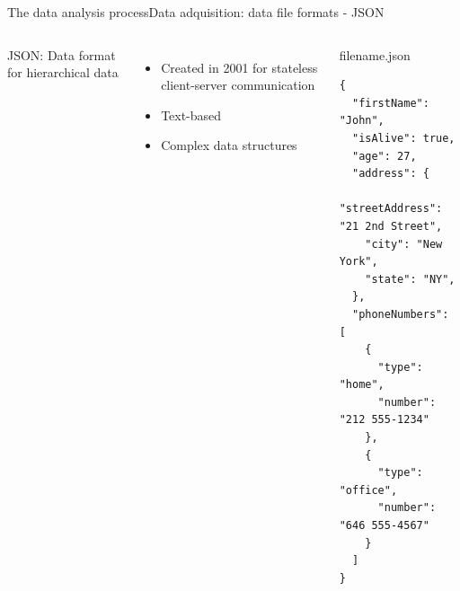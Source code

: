 \documentclass[10pt,compress]{beamer} %
\begin{document}
\begin{frame}[fragile]{The data analysis process}{Data adquisition: data file formats - JSON}
	\begin{columns}
	  JSON: Data format for hierarchical data
		\begin{itemize}
        \item Created in 2001 for stateless client-server communication
        \item Text-based
        \item Complex data structures
		\end{itemize}

        \begin{exampleblock}{filename.json}
		\begin{lstlisting}[basicstyle=\scriptsize]
{
  "firstName": "John",
  "isAlive": true,
  "age": 27,
  "address": {
    "streetAddress": "21 2nd Street",
    "city": "New York",
    "state": "NY",
  },
  "phoneNumbers": [
    {
      "type": "home",
      "number": "212 555-1234"
    },
    {
      "type": "office",
      "number": "646 555-4567"
    }
  ]
}
\end{lstlisting}
        \end{exampleblock}
	\end{columns}
\end{frame}

\end{document}
